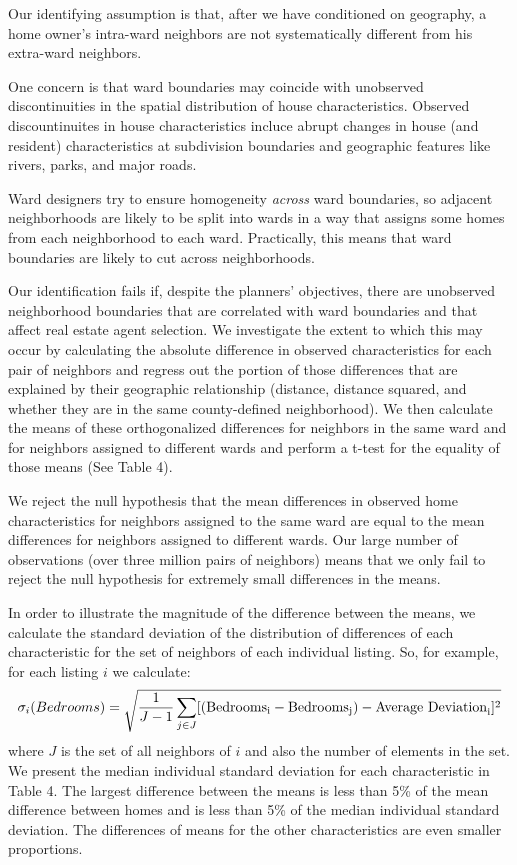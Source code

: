 \documentclass[12pt]{article}
\begin{document}
    Our identifying assumption is that, after we have conditioned on geography, a home owner's intra-ward neighbors are not systematically different
    from his extra-ward neighbors.

    One concern is that ward boundaries may coincide with unobserved discontinuities in the spatial distribution of house characteristics.
    Observed discountinuites in house characteristics incluce abrupt changes in house (and resident) characteristics at subdivision
    boundaries and geographic features like rivers, parks, and major roads.

    Ward designers try to ensure homogeneity \emph{across} ward boundaries, so adjacent neighborhoods are likely to be split into
    wards in a way that assigns some homes from each neighborhood to each ward. Practically, this means that ward boundaries are likely to cut across
    neighborhoods.

    Our identification fails if, despite the planners' objectives, there are unobserved neighborhood boundaries that are correlated with ward
    boundaries and that affect real estate agent
    selection. We investigate the extent to which this may occur by calculating the absolute difference in observed
    characteristics for each pair of neighbors and regress out the portion of those differences that are explained by their geographic relationship
    (distance, distance squared, and whether they are in the same county-defined neighborhood). We then calculate the means of these orthogonalized
    differences for neighbors in the same ward and for neighbors assigned to different wards and perform a t-test for the equality of those means (See
    Table 4).

    We reject the null hypothesis that the mean differences in observed home characteristics for neighbors assigned to the same ward are equal to the
    mean differences for neighbors assigned to different wards. Our large number of observations (over three million pairs of neighbors) means that we only fail to reject the null hypothesis for extremely small differences in the means.

    In order to illustrate the magnitude of the difference between the means, we calculate the standard deviation of the distribution of differences
    of each characteristic for the set of neighbors of each individual listing. So, for example, for each listing $i$ we calculate:
    \[\sigma_i(Bedrooms) = \sqrt{\frac{1}{J-1}\sum_{j \in J}[(\rm{Bedrooms}_i - \rm{Bedrooms}_j) - \rm{Average \ Deviation}_i]^2}\]
    where $J$ is the set of all neighbors of $i$ and also the number of elements in the set. We present the median individual standard deviation for each characteristic in Table 4. The largest
    difference between the means is less than 5\% of the mean difference between homes and is less than 5\% of the median individual standard
    deviation. The differences of means for the other characteristics are even smaller proportions.
\end{document}
